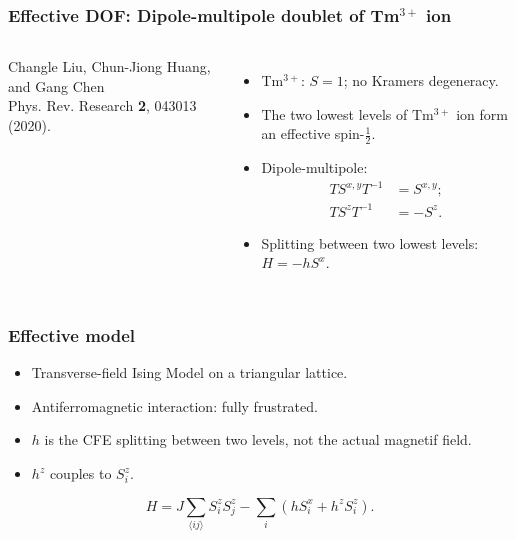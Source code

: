 \documentclass[xcolor=table, aspectratio=1610,ignorenonframetext]{beamer}
\begin{document}
\begin{frame}
  \frametitle{Effective DOF: Dipole-multipole doublet of Tm${}^{3+}$ ion}
  \begin{columns}
    \begin{center}
      
      {\small Changle Liu, Chun-Jiong Huang, and Gang Chen\\
        Phys. Rev. Research \textbf{2}, 043013 (2020).}
    \end{center}
    \begin{itemize}
    \item Tm${}^{3+}$: $S=1$; no Kramers degeneracy.
    \item The two lowest levels of Tm${}^{3+}$ ion form an effective spin-$\frac12$.
    \item Dipole-multipole:
      \begin{align*}TS^{x,y}T^{-1}&=S^{x,y};\\
        TS^zT^{-1}&=-S^z.\end{align*}
    \item Splitting between two lowest levels: $H=-hS^x$.
    \end{itemize}
  \end{columns}
\end{frame}

\begin{frame}
  \frametitle{Effective model}
  \begin{itemize}
  \item Transverse-field Ising Model on a triangular lattice.
  \item Antiferromagnetic interaction: fully frustrated.
  \item $h$ is the CFE splitting between two levels, not the actual magnetif field.
  \item $h^z$ couples to $S_i^z$.
  \end{itemize}
  \[H = J\sum_{\langle ij\rangle}S_i^zS_j^z - \sum_i\left(hS_i^x + h^zS_i^z\right). \]
\end{frame}
\end{document}
